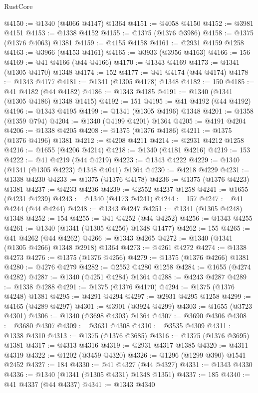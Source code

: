 \begin{lexlean}{RustCore}
\begin{coremodule}
@4150 := @1340 (@4066 @4147) @1364
@4151 := @4058 @4150
@4152 := @3981 @4151
@4153 := @1338 @4152
@4155 := @1375 (@1376 @3986)
@4158 := @1375 (@1376 @4063) @1381
@4159 := @4155 @4158
@4161 := @2931 @4159 @1258
@4163 := @3966 (@4153 @4161)
@4165 := @3933 (@3956 @4163)
@4166 := 156
@4169 := @41 @4166 (@44 @4166)
@4170 := @1343 @4169
@4173 := @1341 (@1305 @4170) @1348
@4174 := 152
@4177 := @41 @4174 (@44 @4174)
@4178 := @1343 @4177
@4181 := @1341 (@1305 @4178) @1348
@4182 := 150
@4185 := @41 @4182 (@44 @4182)
@4186 := @1343 @4185
@4191 := @1340 (@1341 (@1305 @4186) @1348 @1415)
@4192 := 151
@4195 := @41 @4192 (@44 @4192)
@4196 := @1343 @4195
@4199 := @1341 (@1305 @4196) @1348
@4201 := @1358 (@1359 @794)
@4204 := @1340 (@4199 @4201) @1364
@4205 := @4191 @4204
@4206 := @1338 @4205
@4208 := @1375 (@1376 @4186)
@4211 := @1375 (@1376 @4196) @1381
@4212 := @4208 @4211
@4214 := @2931 @4212 @1258
@4216 := @1655 (@4206 @4214)
@4218 := @1340 (@4181 @4216)
@4219 := 153
@4222 := @41 @4219 (@44 @4219)
@4223 := @1343 @4222
@4229 := @1340 (@1341 (@1305 @4223) @1348 @4041) @1364
@4230 := @4218 @4229
@4231 := @1338 @4230
@4233 := @1375 (@1376 @4178)
@4236 := @1375 (@1376 @4223) @1381
@4237 := @4233 @4236
@4239 := @2552 @4237 @1258
@4241 := @1655 (@4231 @4239)
@4243 := @1340 (@4173 @4241)
@4244 := 157
@4247 := @41 @4244 (@44 @4244)
@4248 := @1343 @4247
@4251 := @1341 (@1305 @4248) @1348
@4252 := 154
@4255 := @41 @4252 (@44 @4252)
@4256 := @1343 @4255
@4261 := @1340 (@1341 (@1305 @4256) @1348 @1477)
@4262 := 155
@4265 := @41 @4262 (@44 @4262)
@4266 := @1343 @4265
@4272 := @1340 (@1341 (@1305 @4266) @1348 @2918) @1364
@4273 := @4261 @4272
@4274 := @1338 @4273
@4276 := @1375 (@1376 @4256)
@4279 := @1375 (@1376 @4266) @1381
@4280 := @4276 @4279
@4282 := @2552 @4280 @1258
@4284 := @1655 (@4274 @4282)
@4287 := @1340 (@4251 @4284) @1364
@4288 := @4243 @4287
@4289 := @1338 @4288
@4291 := @1375 (@1376 @4170)
@4294 := @1375 (@1376 @4248) @1381
@4295 := @4291 @4294
@4297 := @2931 @4295 @1258
@4299 := @4165 (@4289 @4297)
@4301 := @3901 (@3924 @4299)
@4303 := @1655 (@3723 @4301)
@4306 := @1340 (@3698 @4303) @1364
@4307 := @3690 @4306
@4308 := @3680 @4307
@4309 := @3631 @4308
@4310 := @3535 @4309
@4311 := @1338 @4310
@4313 := @1375 (@1376 @3685)
@4316 := @1375 (@1376 @3695) @1381
@4317 := @4313 @4316
@4319 := @2931 @4317 @1385
@4320 := @4311 @4319
@4322 := @1202 (@3459 @4320)
@4326 := @1296 (@1299 @390) @1541 @2452
@4327 := 184
@4330 := @41 @4327 (@44 @4327)
@4331 := @1343 @4330
@4336 := @1340 (@1341 (@1305 @4331) @1348 @1351)
@4337 := 185
@4340 := @41 @4337 (@44 @4337)
@4341 := @1343 @4340

\end{coremodule}
\end{lexlean}
